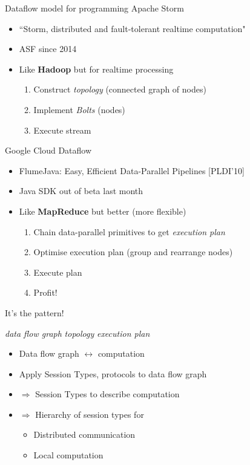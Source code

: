 \documentclass[xcolor={dvipsnames}]{beamer}
\newcommand{\bib}[1]{\textcolor{black!60}{\footnotesize [#1]}}
\begin{document}
\begin{frame}{Dataflow model for programming}
  Apache Storm
  \begin{itemize}
    \item ``Storm, distributed and fault-tolerant realtime computation"
    \item ASF since 2014
    \item Like \textbf{Hadoop} but for realtime processing
      \begin{enumerate}
        \item Construct \alert<2>{\textit{topology}} (connected graph of nodes)
        \item Implement \textit{Bolts} (nodes)
        \item Execute stream
      \end{enumerate}
  \end{itemize}
  Google Cloud Dataflow
  \begin{itemize}
    \item FlumeJava: Easy, Efficient Data-Parallel Pipelines \bib{PLDI'10}
    \item Java SDK out of beta last month
    \item Like \textbf{MapReduce} but better (more flexible)
      \begin{enumerate}
        \item Chain data-parallel primitives to get \alert<2>{\textit{execution plan}}
        \item Optimise execution plan (group and rearrange nodes)
        \item Execute plan
        \item Profit!
      \end{enumerate}
  \end{itemize}
\end{frame}

\begin{frame}{It's the pattern!}
  \begin{center}
    \textit{data flow graph}\qquad
    \textit{topology}\qquad
    \textit{execution plan}
  \end{center}
  \begin{itemize}
    \item Data flow graph $\longleftrightarrow$ computation
    \item Apply Session Types, protocols to data flow graph
    \item $\Rightarrow$ Session Types to describe computation
    \item $\Rightarrow$ Hierarchy of session types for
      \begin{itemize}
        \item Distributed communication
        \item Local computation
      \end{itemize}
  \end{itemize}
\end{frame}
\end{document}
